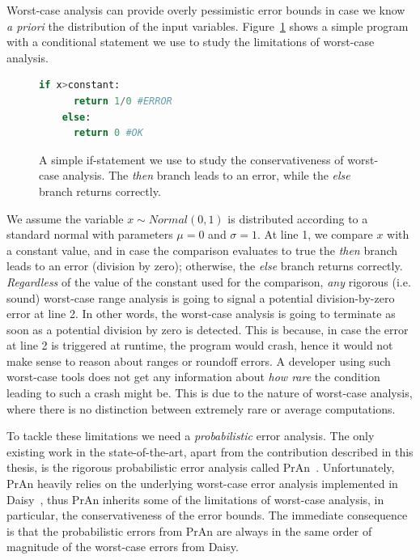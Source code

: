 Worst-case analysis can provide overly pessimistic error bounds in case we know \emph{a priori} the distribution of the input variables. 
%
%
Figure~\ref{fig:prob} shows a simple program with a conditional statement we use to study the limitations of worst-case analysis.
%
\begin{figure}[tb!]
	\begin{lstlisting}[frame=single, language=Python]
	if x>constant:
	  return 1/0 #ERROR
	else:
	  return 0 #OK
	\end{lstlisting}
	\caption{A simple if-statement we use to study the conservativeness of worst-case analysis. The \emph{then} branch leads to an error, while the \emph{else} branch returns correctly.}
	\label{fig:prob}
\end{figure}
%
We assume the variable $x\sim Normal(0,1)$ is distributed according to a standard normal with parameters $\mu = 0$ and $\sigma = 1$.
%
At line 1, we compare $x$ with a constant value, and in case the comparison evaluates to true the \emph{then} branch leads to an error (division by zero); otherwise, the \emph{else} branch returns correctly.
%
\emph{Regardless} of the value of the constant used for the comparison, \emph{any} rigorous (i.e. sound) worst-case range analysis is going to signal a potential division-by-zero error at line 2.
%
In other words, the worst-case analysis is going to terminate as soon as a potential division by zero is detected.
%
This is because, in case the error at line 2 is triggered at runtime, the program would crash, hence it would not make sense to reason about ranges or roundoff errors.
%
A developer using such worst-case tools does not get any information about \emph{how rare} the condition leading to such a crash might be.
%
This is due to the nature of worst-case analysis, where there is no distinction between extremely rare or average computations.
%

To tackle these limitations we need a \emph{probabilistic} error analysis.
%
The only existing work in the state-of-the-art, apart from the contribution described in this thesis, is the rigorous probabilistic error analysis called PrAn~\cite{probdaisy}.
%
Unfortunately, PrAn heavily relies on the underlying worst-case error analysis implemented in Daisy~\cite{darulova2018daisy}, thus PrAn inherits some of the limitations of worst-case analysis, in particular, the conservativeness of the error bounds.
%
The immediate consequence is that the probabilistic errors from PrAn are always in the same order of magnitude of the worst-case errors from Daisy.
%

